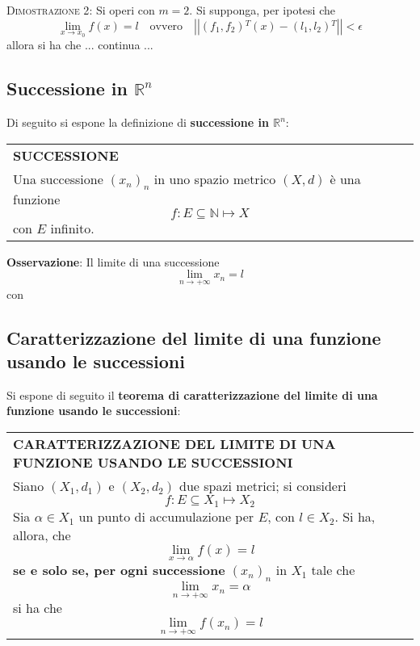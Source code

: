 \documentclass[a4paper]{extarticle}
\renewcommand\arraystretch{}
\begin{document}
\vspace{2em}
\noindent
\normalfont \normalsize
\textsc{Dimostrazione 2}: Si operi con $m=2$. Si supponga, per ipotesi che
\[\lim_{x \to x_0} f(x) = l \hspace{1em} \text{ovvero} \hspace{1em} \left \vert \left \vert (f_1,f_2){^T}(x) - (l_1,l_2){^T} \right \vert \right \vert < \epsilon\]
allora si ha che
... continua ...

\vspace{1em}
\noindent
\subsection{Successione in $\mathbb{R}^n$}
Di seguito si espone la definizione di \textbf{successione in $\mathbb{R}^n$}:

\vspace{1em}
\setlength{\tabcolsep}{14pt}
\renewcommand{\arraystretch}{2}
\noindent
\begin{tabularx}{\textwidth}{@{}|P|@{}}
    \hline
    {\textbf{SUCCESSIONE}}\\
    \parbox{\linewidth}{Una successione $(x_n)_n$ in uno spazio metrico $(X,d)$ è una funzione
    \[f : E \subseteq \mathbb{N} \longmapsto X\]
    con $E$ infinito.
    \vspace{3mm}}\\
    \hline
\end{tabularx}

\vspace{2em}
\noindent
\textbf{Osservazione}: Il limite di una successione
\[\lim_{n \to +\infty} x_n = l\]
con 

\vspace{2em}
\noindent
\subsection{Caratterizzazione del limite di una funzione usando le successioni}
Si espone di seguito il \textbf{teorema di caratterizzazione del limite di una funzione usando le successioni}:

\vspace{1em}
\setlength{\tabcolsep}{14pt}
\renewcommand{\arraystretch}{2}
\noindent
\begin{tabularx}{\textwidth}{@{}|P|@{}}
    \hline
    {\textbf{CARATTERIZZAZIONE DEL LIMITE DI UNA FUNZIONE USANDO LE SUCCESSIONI}}\\
    \parbox{\linewidth}{Siano $(X_1,d_1)$ e $(X_2,d_2)$ due spazi metrici; si consideri
    \[f : E \subseteq X_1 \longmapsto X_2\]
    Sia $\alpha \in X_1$ un punto di accumulazione per $E$, con $l \in X_2$. Si ha, allora, che
    \[\lim_{x \to \alpha} f(x) = l\]
    \textbf{se e solo se, per ogni successione} $(x_n)_n$ in $X_1$ tale che
    \[\lim_{n \to +\infty} x_n = \alpha\]
    si ha che
    \[\lim_{n \to +\infty} f(x_n) = l\]
    \vspace{-1mm}}\\
    \hline
\end{tabularx}
\end{document}
